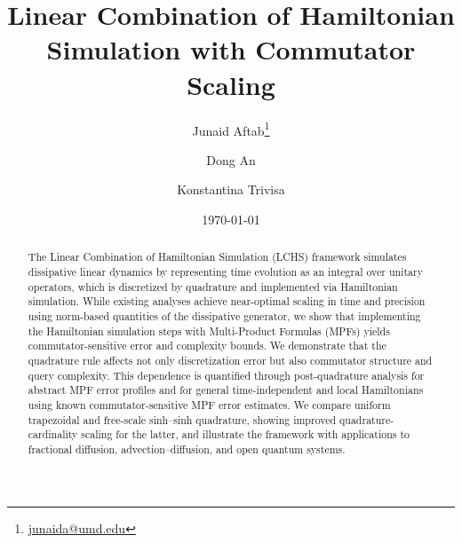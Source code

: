 \documentclass[10pt,reqno]{article}
\numberwithin{equation}{section}
\theoremstyle{plain}
\theoremstyle{definition}
\begin{document}
\title{Linear Combination of Hamiltonian Simulation with Commutator Scaling} 


\author[1]{Junaid Aftab\thanks{\href{mailto:junaida@umd.edu}{junaida@umd.edu}}} \author[2,3]{Dong An} \author[1]{Konstantina Trivisa}   

\date{\today}

\maketitle

\begin{abstract}
The Linear Combination of Hamiltonian Simulation (LCHS) framework simulates dissipative linear dynamics by representing time evolution as an integral over unitary operators, which is discretized by quadrature and implemented via Hamiltonian simulation. While existing analyses achieve near-optimal scaling in time and precision using norm-based quantities of the dissipative generator, we show that implementing the Hamiltonian simulation steps with Multi-Product Formulas (MPFs) yields commutator-sensitive error and complexity bounds. We demonstrate that the quadrature rule affects not only discretization error but also commutator structure and query complexity. This dependence is quantified through post-quadrature analysis for abstract MPF error profiles and for general time-independent and local Hamiltonians using known commutator-sensitive MPF error estimates. We compare uniform trapezoidal and free-scale sinh--sinh quadrature, showing improved quadrature-cardinality scaling for the latter, and illustrate the framework with applications to fractional diffusion, advection--diffusion, and open quantum systems.
\end{abstract}


\end{document}
